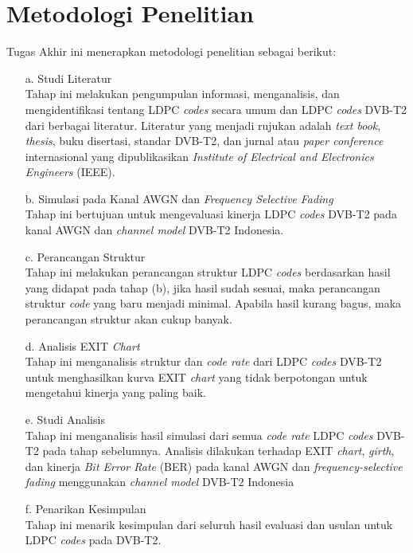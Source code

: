 \section{Metodologi Penelitian}
Tugas Akhir ini menerapkan metodologi penelitian sebagai berikut:	
\begin{itemize}
	\item[a.] Studi Literatur\\	
	Tahap ini melakukan pengumpulan informasi, menganalisis, dan mengidentifikasi tentang LDPC \textit{codes} secara umum dan LDPC \textit{codes} DVB-T2 dari berbagai literatur. Literatur yang menjadi rujukan adalah \textit{text book}, \textit{thesis}, buku disertasi, standar DVB-T2, dan jurnal atau \textit{paper conference} internasional yang dipublikasikan \textit{Institute of Electrical and Electronics Engineers} (IEEE).
	\item[b.] Simulasi pada Kanal AWGN dan \textit{Frequency Selective} \textit{Fading}\\
	Tahap ini bertujuan untuk mengevaluasi kinerja LDPC \textit{codes} DVB-T2 pada kanal AWGN dan \textit{channel model} DVB-T2 Indonesia.
	\item[c.] Perancangan Struktur\\	
	Tahap ini melakukan perancangan struktur LDPC \textit{codes} berdasarkan hasil yang didapat pada tahap (b), jika hasil sudah sesuai, maka perancangan struktur \textit{code} yang baru menjadi minimal. Apabila hasil kurang bagus, maka perancangan struktur akan cukup banyak. 
	\item[d.] Analisis EXIT \textit{Chart}\\
	Tahap ini menganalisis struktur dan \textit{code rate} dari LDPC \textit{codes} DVB-T2 untuk menghasilkan kurva EXIT \textit{chart} yang tidak berpotongan  untuk mengetahui kinerja yang paling baik.  
	\item[e.] Studi Analisis\\
	Tahap ini menganalisis hasil simulasi dari semua \textit{code rate} LDPC \textit{codes} DVB-T2 pada tahap sebelumnya. Analisis dilakukan terhadap EXIT \textit{chart}, \textit{girth}, dan kinerja \textit{Bit Error Rate} (BER) pada kanal AWGN dan \textit{frequency-selective fading} menggunakan \textit{channel model} DVB-T2 Indonesia
	\item[f.] Penarikan Kesimpulan\\
	Tahap ini menarik kesimpulan dari seluruh hasil evaluasi dan usulan untuk LDPC \textit{codes} pada DVB-T2.  
\end{itemize}


